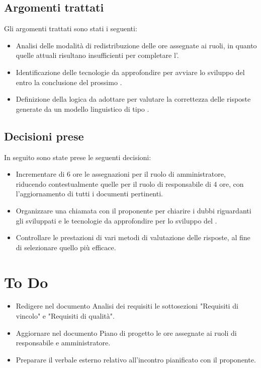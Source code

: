 \documentclass[a4paper, 12pt]{article}
\begin{document}
\subsection{Argomenti trattati}
Gli argomenti trattati sono stati i seguenti:
\begin{itemize}
    \item Analisi delle modalità di redistribuzione delle ore assegnate ai ruoli, in quanto quelle attuali risultano insufficienti per completare l'.
    \item Identificazione delle tecnologie da approfondire per avviare lo sviluppo del  entro la conclusione del prossimo .
    \item Definizione della logica da adottare per valutare la correttezza delle risposte generate da un modello linguistico di tipo .
\end{itemize}

\subsection{Decisioni prese}
In seguito sono state prese le seguenti decisioni:
\begin{itemize}
    \item Incrementare di 6 ore le assegnazioni per il ruolo di amministratore, riducendo contestualmente quelle per il ruolo di responsabile di 4 ore, con l'aggiornamento di tutti i documenti pertinenti.
    \item Organizzare una chiamata con il proponente per chiarire i dubbi riguardanti gli  sviluppati e le tecnologie da approfondire per lo sviluppo del .
    \item Controllare le prestazioni di vari metodi di valutazione delle risposte, al fine di selezionare quello più efficace.
\end{itemize}

\section{To Do}
\begin{itemize}
    \item Redigere nel documento Analisi dei requisiti le sottosezioni "Requisiti di vincolo" e "Requisiti di qualità".
    \item Aggiornare nel documento Piano di progetto le ore assegnate ai ruoli di responsabile e amministratore.
    \item Preparare il verbale esterno relativo all'incontro pianificato con il proponente.
\end{itemize}
\end{document}
